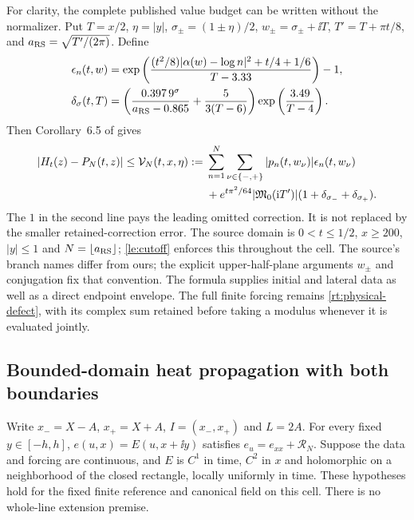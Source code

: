 For clarity, the complete published value budget can be written without
the normalizer. Put $T=x/2$, $\eta=|y|$, $\sigma_\pm=(1\pm\eta)/2$,
$w_\pm=\sigma_\pm+\ii T$, $T'=T+\pi t/8$, and
$a_{\rm RS}=\sqrt{T'/(2\pi)}$. Define
\begin{align}
 \epsilon_n(t,w)&=\exp\left(
 \frac{(t^2/8)|\alpha(w)-\log n|^2+t/4+1/6}{T-3.33}
 \right)-1,\notag\\
 \delta_\sigma(t,T)&=
 \left(\frac{0.397\,9^\sigma}{a_{\rm RS}-0.865}
                 +\frac5{3(T-6)}\right)
                 \exp\left(\frac{3.49}{T-4}\right).
 \label{le:source-errors}
\end{align}
Then Corollary~6.5 of \cite{Polymath2019} gives
\begin{align}
 |H_t(z)-P_N(t,z)|\le\mathcal V_N(t,x,\eta)
 :={}&\sum_{n=1}^N\sum_{\nu\in\{-,+\}}
                 |p_n(t,w_\nu)|\epsilon_n(t,w_\nu)\notag\\
 &+e^{t\pi^2/64}|\mathfrak M_0(\mathrm i T')|
                   (1+\delta_{\sigma_-}+\delta_{\sigma_+}).
 \label{le:source-value}
\end{align}
The $1$ in the second line pays the leading omitted correction. It is
not replaced by the smaller retained-correction error. The source domain
is $0<t\le1/2$, $x\ge200$, $|y|\le1$ and $N=\lfloor a_{\rm RS}\rfloor$;
\eqref{le:cutoff} enforces this throughout the cell. The source's branch
names differ from ours; the explicit upper-half-plane arguments $w_\pm$
and conjugation fix that convention. The formula supplies initial and
lateral data as well as a direct endpoint envelope. The full finite
forcing remains \eqref{rt:physical-defect}, with its complex sum retained
before taking a modulus whenever it is evaluated jointly.

\subsection{Bounded-domain heat propagation with both boundaries}

Write $x_-=X-A$, $x_+=X+A$, $I=(x_-,x_+)$ and $L=2A$.
For every fixed $y\in[-h,h]$, $e(u,x)=E(u,x+\ii y)$ satisfies
$e_u=e_{xx}+\mathcal R_N$. Suppose the data and forcing are continuous,
and $E$ is $C^1$ in time, $C^2$ in $x$ and holomorphic on a neighborhood
of the closed rectangle, locally uniformly in time. These hypotheses
hold for the fixed finite reference and canonical field on this cell.
There is no whole-line extension premise.

